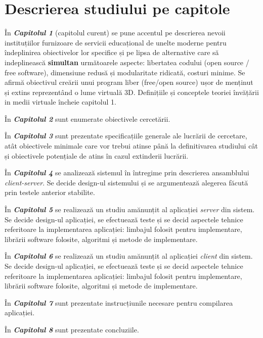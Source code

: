 \section{Descrierea studiului pe capitole}
\par În \textbf{\textit{Capitolul 1}} (capitolul curent) se pune accentul pe descrierea nevoii instituțiilor furnizoare de servicii educațional de unelte moderne pentru îndeplinirea obiectivelor lor specifice și pe lipsa de alternative care să indeplinească  \textbf{simultan} următoarele aspecte: libertatea codului (open source / free software), dimensiune redusă și modularitate ridicată, costuri minime. Se afirmă obiectivul creării unui program liber (free/open source) ușor de menținut și extins reprezentând o lume virtuală 3D. Definițiile și conceptele teoriei învățării in medii virtuale încheie capitolul 1.
\par În \textbf{\textit{Capitolul 2}} sunt enumerate obiectivele cercetării.
\par În \textbf{\textit{Capitolul 3}} sunt prezentate specificațiile generale ale lucrării de cercetare, atât obiectivele minimale care vor trebui atinse până la definitivarea studiului cât și obiectivele potențiale de atins în cazul extinderii lucrării.
\par În \textbf{\textit{Capitolul 4}} se analizează sistemul în întregime prin descrierea ansamblului \textit{client-server}. Se decide design-ul  sistemului și se argumentează alegerea făcută prin testele anterior stabilite.
\par În \textbf{\textit{Capitolul 5}} se realizează un studiu amănunțit al aplicației \textit{server} din sistem. Se decide design-ul aplicației, se efectuează teste și se decid aspectele tehnice referitoare la implementarea aplicației: limbajul folosit pentru implementare, librării software folosite, algoritmi și metode de implementare.
\par În \textbf{\textit{Capitolul 6}} se realizează un studiu amănunțit al aplicației \textit{client} din sistem. Se decide design-ul aplicației, se efectuează teste și se decid aspectele tehnice referitoare la implementarea aplicației: limbajul folosit pentru implementare, librării software folosite, algoritmi și metode de implementare.
\par În \textbf{\textit{Capitolul 7}} sunt prezentate instrucțiunile necesare pentru compilarea aplicației. 
\par În \textbf{\textit{Capitolul 8}} sunt prezentate concluziile. 
